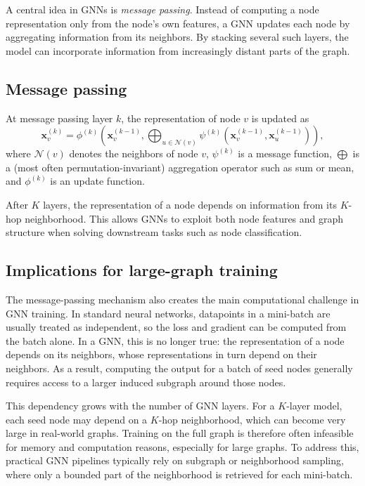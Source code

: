 \documentclass[ oneside,openright,titlepage,numbers=noenddot,headinclude,%
                footinclude=true,cleardoublepage=empty,abstractoff, %
                BCOR=0mm,paper=a4,fontsize=11pt,%
                ngerman,american,%
                ]{scrreprt}
\begin{document}
A central idea in GNNs is \emph{message passing}. 
Instead of computing a node representation only from the node's own features, a GNN updates each node by aggregating information from its neighbors. 
By stacking several such layers, the model can incorporate information from increasingly distant parts of the graph.

\subsection{Message passing}

At message passing layer $k$, the representation of node $v$ is updated as
\[
\mathbf{x}_v^{(k)} =
\phi^{(k)}\!\left(
\mathbf{x}_v^{(k-1)},
\bigoplus_{u \in \mathcal{N}(v)}
\psi^{(k)}\!\left(\mathbf{x}_v^{(k-1)}, \mathbf{x}_u^{(k-1)}\right)
\right),
\]
where $\mathcal{N}(v)$ denotes the neighbors of node $v$, $\psi^{(k)}$ is a message function, $\bigoplus$ is a (most often permutation-invariant) aggregation operator such as sum or mean, and $\phi^{(k)}$ is an update function.

After $K$ layers, the representation of a node depends on information from its $K$-hop neighborhood. 
This allows GNNs to exploit both node features and graph structure when solving downstream tasks such as node classification.

\subsection{Implications for large-graph training}

The message-passing mechanism also creates the main computational challenge in GNN training. 
In standard neural networks, datapoints in a mini-batch are usually treated as independent, so the loss and gradient can be computed from the batch alone. 
In a GNN, this is no longer true: the representation of a node depends on its neighbors, whose representations in turn depend on their neighbors. 
As a result, computing the output for a batch of seed nodes generally requires access to a larger induced subgraph around those nodes.

This dependency grows with the number of GNN layers. 
For a $K$-layer model, each seed node may depend on a $K$-hop neighborhood, which can become very large in real-world graphs. 
Training on the full graph is therefore often infeasible for memory and computation reasons, especially for large graphs. 
To address this, practical GNN pipelines typically rely on subgraph or neighborhood sampling, where only a bounded part of the neighborhood is retrieved for each mini-batch.
\end{document}
